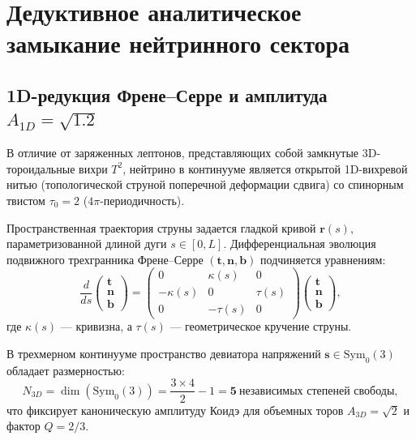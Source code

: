 \documentclass[11pt,a4paper]{article}
\theoremstyle{definition}
\theoremstyle{remark}
\begin{document}

\section{Дедуктивное аналитическое замыкание нейтринного сектора}
\label{sec:neutrinos}

\subsection{1D-редукция Френе--Серре и амплитуда $A_{1D} = \sqrt{1.2}$}
В отличие от заряженных лептонов, представляющих собой замкнутые 3D-тороидальные вихри $T^2$, нейтрино в континууме является открытой 1D-вихревой нитью (топологической струной поперечной деформации сдвига) со спинорным твистом $\tau_0 = 2$ ($4\pi$-периодичность).

Пространственная траектория струны задается гладкой кривой $\mathbf{r}(s)$, параметризованной длиной дуги $s \in [0, L]$. Дифференциальная эволюция подвижного трехгранника Френе--Серре $(\mathbf{t}, \mathbf{n}, \mathbf{b})$ подчиняется уравнениям:
\begin{equation}
	\frac{d}{ds} \begin{pmatrix} \mathbf{t} \\ \mathbf{n} \\ \mathbf{b} \end{pmatrix} = \begin{pmatrix} 0 & \kappa(s) & 0 \\ -\kappa(s) & 0 & \tau(s) \\ 0 & -\tau(s) & 0 \end{pmatrix} \begin{pmatrix} \mathbf{t} \\ \mathbf{n} \\ \mathbf{b} \end{pmatrix},
\end{equation}
где $\kappa(s)$ --- кривизна, а $\tau(s)$ --- геометрическое кручение струны.

В трехмерном континууме пространство девиатора напряжений $\mathbf{s} \in \mathrm{Sym}_0(3)$ обладает размерностью:
\begin{equation}
	N_{3D} = \dim(\mathrm{Sym}_0(3)) = \frac{3 \times 4}{2} - 1 = \mathbf{5} \ \text{независимых степеней свободы},
\end{equation}
что фиксирует каноническую амплитуду Коидэ для объемных торов $A_{3D} = \sqrt{2}$ и фактор $Q = 2/3$.
\end{document}
